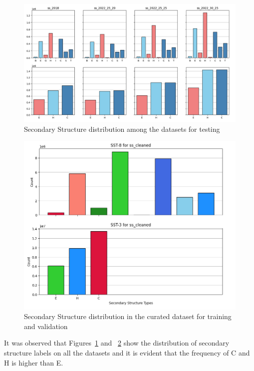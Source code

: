 \documentclass[conference]{IEEEtran}
\begin{document}
\begin{figure}[hbtp]
\centerline{\includegraphics[width=\linewidth]{figs/sst3-8.png}}
\caption{
Secondary Structure distribution among the datasets for testing} 
\label{sst3-8}
\end{figure}

\begin{figure}[hbtp]
\centerline{\includegraphics[width=\linewidth]{figs/sst3-8-cleaned.png}}
\caption{
Secondary Structure distribution in the curated dataset for training and validation
} 
\label{sst3-8-cleaned}
\end{figure}
It was observed that Figures~\ref{sst3-8} and ~\ref{sst3-8-cleaned} show the distribution of secondary structure labels on all the datasets and it is evident that the frequency of C and H is higher than E. 
\end{document}
